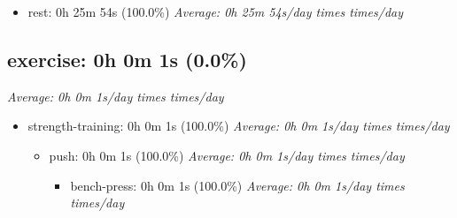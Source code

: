 \documentclass[12pt]{extarticle}
\begin{document}
\begin{itemize}[topsep=0pt, itemsep=-0.5ex]
    \item rest: 0h 25m 54s (100.0\%)
        \textit{Average: 0h 25m 54s/day  times  times/day}\par
\end{itemize}
{\fontsize{16}{19.2}\selectfont\subsection*{exercise: 0h 0m 1s (0.0\%)}}
\textit{Average: 0h 0m 1s/day  times  times/day}\par
\begin{itemize}[topsep=0pt, itemsep=-0.5ex]
    \item strength-training: 0h 0m 1s (100.0\%)
        \textit{Average: 0h 0m 1s/day  times  times/day}\par
\begin{itemize}[topsep=0pt, itemsep=-0.5ex]
    \item push: 0h 0m 1s (100.0\%)
        \textit{Average: 0h 0m 1s/day  times  times/day}\par
\begin{itemize}[topsep=0pt, itemsep=-0.5ex]
    \item bench-press: 0h 0m 1s (100.0\%)
        \textit{Average: 0h 0m 1s/day  times  times/day}\par
\end{itemize}
\end{itemize}
\end{itemize}
\end{document}
